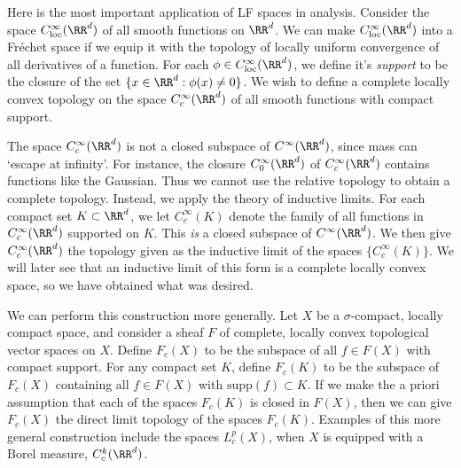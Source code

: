 \begin{example}
    Here is the most important application of LF spaces in analysis. Consider the space $C^\infty_{\text{loc}}(\RR^d)$ of all smooth functions on $\RR^d$. We can make $C^\infty_{\text{loc}}(\RR^d)$ into a Fr\'{e}chet space if we equip it with the topology of locally uniform convergence of all derivatives of a function. For each $\phi \in C^\infty_{\text{loc}}(\RR^d)$, we define it's \emph{support} to be the closure of the set $\{ x \in \RR^d: \phi(x) \neq 0 \}$. We wish to define a complete locally convex topology on the space $C_c^\infty(\RR^d)$ of all smooth functions with compact support.

    The space $C_c^\infty(\RR^d)$ is not a closed subspace of $C^\infty(\RR^d)$, since mass can `escape at infinity'. For instance, the closure $C_0^\infty(\RR^d)$ of $C_c^\infty(\RR^d)$ contains functions like the Gaussian. Thus we cannot use the relative topology to obtain a complete topology. Instead, we apply the theory of inductive limits. For each compact set $K \subset \RR^d$, we let $C_c^\infty(K)$ denote the family of all functions in $C_c^\infty(\RR^d)$ supported on $K$. This \emph{is} a closed subspace of $C^\infty(\RR^d)$. We then give $C_c^\infty(\RR^d)$ the topology given as the inductive limit of the spaces $\{ C_c^\infty(K) \}$. We will later see that an inductive limit of this form is a complete locally convex space, so we have obtained what was desired.

    We can perform this construction more generally. Let $X$ be a $\sigma$-compact, locally compact space, and consider a sheaf $F$ of complete, locally convex topological vector spaces on $X$. Define $F_c(X)$ to be the subspace of all $f \in F(X)$ with compact support. For any compact set $K$, define $F_c(K)$ to be the subspace of $F_c(X)$ containing all $f \in F(X)$ with $\text{supp}(f) \subset K$. If we make the a priori assumption that each of the spaces $F_c(K)$ is closed in $F(X)$, then we can give $F_c(X)$ the direct limit topology of the spaces $F_c(K)$. Examples of this more general construction include the spaces $L^p_c(X)$, when $X$ is equipped with a Borel measure, $C^k_c(\RR^d)$.
\end{example}

